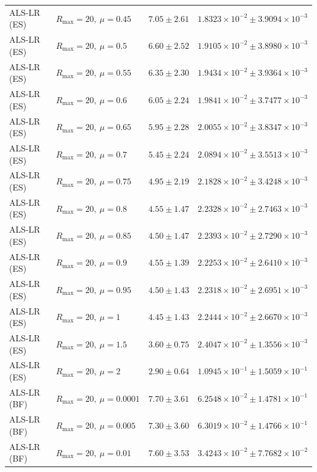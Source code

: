 \begin{table}[t]
\begin{tabular}{@{}llcc@{}}
ALS-LR (ES) & \(R_{\max}=20,\ \mu=0.45\) & \(7.05 \pm 2.61\) & \(1.8323{\times}10^{-2} \pm 3.9094{\times}10^{-3}\) \\
ALS-LR (ES) & \(R_{\max}=20,\ \mu=0.5\) & \(6.60 \pm 2.52\) & \(1.9105{\times}10^{-2} \pm 3.8980{\times}10^{-3}\) \\
ALS-LR (ES) & \(R_{\max}=20,\ \mu=0.55\) & \(6.35 \pm 2.30\) & \(1.9434{\times}10^{-2} \pm 3.9364{\times}10^{-3}\) \\
ALS-LR (ES) & \(R_{\max}=20,\ \mu=0.6\) & \(6.05 \pm 2.24\) & \(1.9841{\times}10^{-2} \pm 3.7477{\times}10^{-3}\) \\
ALS-LR (ES) & \(R_{\max}=20,\ \mu=0.65\) & \(5.95 \pm 2.28\) & \(2.0055{\times}10^{-2} \pm 3.8347{\times}10^{-3}\) \\
ALS-LR (ES) & \(R_{\max}=20,\ \mu=0.7\) & \(5.45 \pm 2.24\) & \(2.0894{\times}10^{-2} \pm 3.5513{\times}10^{-3}\) \\
ALS-LR (ES) & \(R_{\max}=20,\ \mu=0.75\) & \(4.95 \pm 2.19\) & \(2.1828{\times}10^{-2} \pm 3.4248{\times}10^{-3}\) \\
ALS-LR (ES) & \(R_{\max}=20,\ \mu=0.8\) & \(4.55 \pm 1.47\) & \(2.2328{\times}10^{-2} \pm 2.7463{\times}10^{-3}\) \\
ALS-LR (ES) & \(R_{\max}=20,\ \mu=0.85\) & \(4.50 \pm 1.47\) & \(2.2393{\times}10^{-2} \pm 2.7290{\times}10^{-3}\) \\
ALS-LR (ES) & \(R_{\max}=20,\ \mu=0.9\) & \(4.55 \pm 1.39\) & \(2.2253{\times}10^{-2} \pm 2.6410{\times}10^{-3}\) \\
ALS-LR (ES) & \(R_{\max}=20,\ \mu=0.95\) & \(4.50 \pm 1.43\) & \(2.2318{\times}10^{-2} \pm 2.6951{\times}10^{-3}\) \\
ALS-LR (ES) & \(R_{\max}=20,\ \mu=1\) & \(4.45 \pm 1.43\) & \(2.2444{\times}10^{-2} \pm 2.6670{\times}10^{-3}\) \\
ALS-LR (ES) & \(R_{\max}=20,\ \mu=1.5\) & \(3.60 \pm 0.75\) & \(2.4047{\times}10^{-2} \pm 1.3556{\times}10^{-3}\) \\
ALS-LR (ES) & \(R_{\max}=20,\ \mu=2\) & \(2.90 \pm 0.64\) & \(1.0945{\times}10^{-1} \pm 1.5059{\times}10^{-1}\) \\
ALS-LR (BF) & \(R_{\max}=20,\ \mu=0.0001\) & \(7.70 \pm 3.61\) & \(6.2548{\times}10^{-2} \pm 1.4781{\times}10^{-1}\) \\
ALS-LR (BF) & \(R_{\max}=20,\ \mu=0.005\) & \(7.30 \pm 3.60\) & \(6.3019{\times}10^{-2} \pm 1.4766{\times}10^{-1}\) \\
ALS-LR (BF) & \(R_{\max}=20,\ \mu=0.01\) & \(7.60 \pm 3.53\) & \(3.4243{\times}10^{-2} \pm 7.7682{\times}10^{-2}\) \\

\end{tabular}
\end{table}
